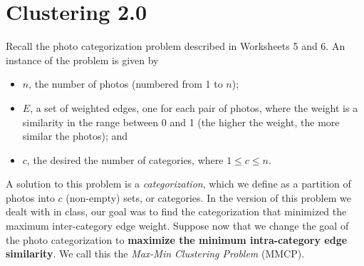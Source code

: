 \section{Clustering 2.0}

Recall the photo categorization problem described in Worksheets 5 and 6. An instance of the problem is given by
\begin{itemize}
	\item $n$, the number of photos (numbered from 1 to $n$);
	\item $E$, a set of weighted edges, one for each pair of photos, where the weight is a similarity in the range between 0 and 1 (the higher the weight, the more similar the photos); and
	\item $c$, the desired the number of categories, where $1 \le c \le n$.
\end{itemize}

A solution to this problem is a \textit{categorization}, which we define as a partition of photos into $c$ (non-empty) sets, or categories. In the version of this problem we dealt with in class, our goal was to find the categorization that minimized the maximum inter-category edge weight. Suppose now that we change the goal of the photo categorization to \textbf{maximize the minimum intra-category edge similarity}. We call this the \textit{Max-Min Clustering Problem} (MMCP).

